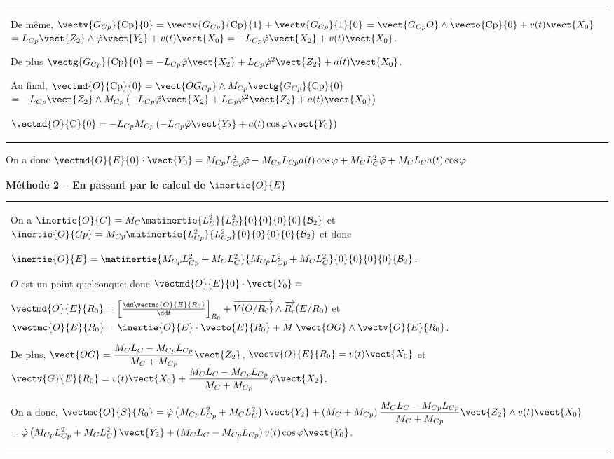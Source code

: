 \begin{corrige}
\begin{tabular}{|p{.9\linewidth}}
De même, $\vectv{G_{Cp}}{\text{Cp}}{0}=\vectv{G_{Cp}}{\text{Cp}}{1}+\vectv{G_{Cp}}{\text{1}}{0}$ $=\vect{G_{Cp}O}\wedge \vecto{\text{Cp}}{0}+v(t)\vect{X_0}$ $=L_{Cp}\vect{Z_2}\wedge \dot{\varphi}\vect{Y_2}+v(t)\vect{X_0}=-L_{Cp} \dot{\varphi}\vect{X_2}+v(t)\vect{X_0}$. 

De plus  $\vectg{G_{Cp}}{\text{Cp}}{0}=-L_{Cp} \ddot{\varphi}\vect{X_2}+L_{Cp} \dot{\varphi}^2\vect{Z_2}+a(t)\vect{X_0}$. 

Au final, $\vectmd{O}{\text{Cp}}{0} = \vect{OG_{Cp}} \wedge M_{Cp}\vectg{G_{Cp}}{\text{Cp}}{0}$
$ =-L_{Cp}\vect{Z_2} \wedge M_{Cp} \left( -L_{Cp} \ddot{\varphi}\vect{X_2}+L_{Cp} \dot{\varphi}^2\vect{Z_2}+a(t)\vect{X_0}\right)$

$\vectmd{O}{\text{C}}{0} =-L_{Cp} M_{Cp} \left( -L_{Cp} \ddot{\varphi}\vect{Y_2} +a(t)\cos\varphi\vect{Y_0} \right)$
\\
\end{tabular}

On a donc $\vectmd{O}{E}{0}\cdot \vect{Y_0} =M_{Cp} L_{Cp}^2 \ddot{\varphi} -M_{Cp}L_{Cp}a(t)\cos\varphi +  M_CL_C^2 \ddot{\varphi} +M_CL_Ca(t) \cos \varphi $

\textbf{Méthode 2 -- En passant par le calcul de $\inertie{O}{E}$}

 \begin{tabular}{|p{.9\linewidth}}
On a $\inertie{O}{C}=M_C\matinertie{L_C^2}{L_C^2}{0}{0}{0}{0}{\mathcal{B}_2}$ et $\inertie{O}{Cp}=M_{Cp}\matinertie{L_{Cp}^2}{L_{Cp}^2}{0}{0}{0}{0}{\mathcal{B}_2}$ et donc 

$\inertie{O}{E}=\matinertie{M_{Cp}L_{Cp}^2+M_{C}L_{C}^2}{M_{Cp}L_{Cp}^2+M_{C}L_{C}^2}{0}{0}{0}{0}{\mathcal{B}_2}$.

$O$ est un point quelconque; donc $\vectmd{O}{E}{0}\cdot \vect{Y_0} =$

$\vectmd{O}{E}{R_0}=\left[\frac{\dd \vectmc{O}{E}{R_0}}{\dd t}\right]_{R_0}+\overrightarrow{V(O/R_0)}\wedge \overrightarrow{R_c}(E/R_0)$ et 
$\vectmc{O}{E}{R_0}=\inertie{O}{E}\cdot \vecto{E}{R_0}+M\;\vect{OG}\wedge \vectv{O}{E}{R_0}$. 

De plus, 
$\vect{OG}=\dfrac{M_CL_C-M_{Cp}L_{Cp}}{M_C+M_{Cp}}\vect{Z_2}$, $\vectv{O}{E}{R_0}=v(t)\vect{X_0}$ et
$\vectv{G}{E}{R_0}=v(t)\vect{X_0}+\dfrac{M_CL_C-M_{Cp}L_{Cp}}{M_C+M_{Cp}}\dot{\varphi}\vect{X_2}$.


On a donc, 
$\vectmc{O}{S}{R_0}=\dot{\varphi}\left(M_{Cp}L_{Cp}^2+M_{C}L_{C}^2 \right)\vect{Y_2}+\left( M_C+M_{Cp}\right) \dfrac{M_CL_C-M_{Cp}L_{Cp}}{M_C+M_{Cp}}\vect{Z_2}\wedge v(t)\vect{X_0}$
$ = \dot{\varphi}\left(M_{Cp}L_{Cp}^2+M_{C}L_{C}^2 \right)\vect{Y_2}+\left( M_CL_C-M_{Cp}L_{Cp}\right) v(t)\cos\varphi \vect{Y_0}$.


\end{tabular}
\end{corrige}
